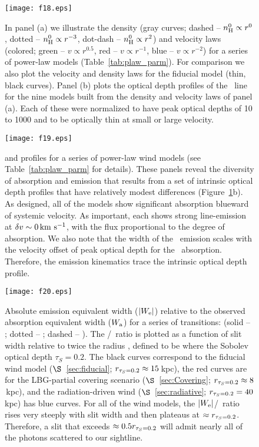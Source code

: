 \documentclass[12pt,preprint]{aastex}
\begin{document}
\begin{figure}
\texttt{[image: f18.eps]}
\caption{
In panel (a) we illustrate the density (gray curves; dashed -- $n_{\rm H}^0
\propto r^0$, dotted -- $n_{\rm H}^0 \propto r^{-3}$, dot-dash -- $n_{\rm H}^0
\propto r^{2}$) and velocity laws (colored; green -- $v \propto
r^{0.5}$, red -- $v \propto r^{-1}$, blue -- $v \propto r^{-2}$) for a
series of power-law models (Table~\ref{tab:plaw_parm}).  For
comparison we also plot the velocity and density laws for the fiducial
model (thin, black curves).  
Panel (b) plots the optical depth profiles of the \mgiia\ line for
the nine models built from the density and velocity laws of panel (a).
Each of these were normalized to have peak optical depths of 10 to
1000 and to be optically thin at small or large velocity.
}
\label{fig:plaws}
\end{figure}

\begin{figure}
\texttt{[image: f19.eps]}
\caption{
 and  profiles for a series of power-law wind
models (see Table~\ref{tab:plaw_parm} for details).  These panels reveal
the diversity of absorption and emission that results from a set of
intrinsic optical depth profiles that have relatively modest
differences (Figure~\ref{fig:plaws}b).  As designed, all of the models
show significant absorption blueward of systemic velocity.  As
important, each shows strong line-emission at $\delta v \sim 0 \, {\rm km~s^{-1}}$,
with the flux proportional to the degree of absorption.
We also note that the width of the \feiic\ emission scales with the
velocity offset of peak optical depth for the \feiia\ absorption.
Therefore, the emission kinematics trace the intrinsic
optical depth profile.
}
\label{fig:plaws_spec}
\end{figure}


\begin{figure}
\texttt{[image: f20.eps]}
\caption{
Absolute emission equivalent width ($|W_{\rm e}|$) relative to the observed
absorption equivalent width ($W_{\rm a}$) for a series of transitions:
(solid -- \mgiia; dotted -- \mgiib; dashed -- \feiib).  The
\ewe/\ewabs\ ratio is plotted as a function of slit width relative to
twice the radius \rtt, defined to be where the Sobolev optical depth 
$\tau_S = 0.2$.  The black curves correspond to the fiducial wind
model ($\S$~\ref{sec:fiducial}; $r_{\tau_S = 0.2} \approx 15$\,kpc), the red curves are for the
LBG-partial covering scenario ($\S$~\ref{sec:Covering}; $r_{\tau_S = 0.2} \approx
8$\,kpc), and the
radiation-driven wind ($\S$~\ref{sec:radiative}; $r_{\tau_S = 0.2} = 40$kpc) has blue curves.
For all of the wind models, the $|W_{\rm e}|$/\ewabs\ ratio rises very steeply
with slit width and then plateaus at $\approx r_{\tau_S = 0.2}$.  
Therefore, a slit that exceeds $\approx 0.5 r_{\tau_S = 0.2}$ will admit nearly
all of the photons scattered to our sightline.
}
\label{fig:obs_slit}
\end{figure}
\end{document}
